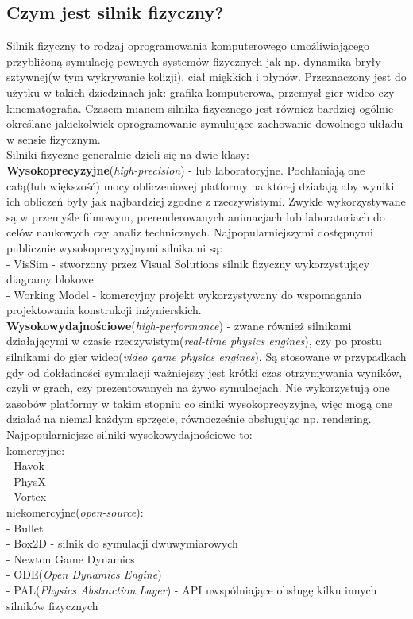   \subsection{Czym jest silnik fizyczny?}\label{subsec:czymJestSilnik}
Silnik fizyczny to rodzaj oprogramowania komputerowego umożliwiającego
przybliżoną symulację pewnych systemów fizycznych jak np. dynamika bryły
sztywnej(w tym wykrywanie kolizji), ciał miękkich i płynów. Przeznaczony jest do
użytku w takich dziedzinach jak: grafika komputerowa, przemysł gier wideo czy
kinematografia. Czasem mianem silnika fizycznego jest również bardziej ogólnie
określane jakiekolwiek oprogramowanie symulujące zachowanie dowolnego
układu w sensie fizycznym.\\
Silniki fizyczne generalnie dzieli się na dwie klasy:\\
\textbf{Wysokoprecyzyjne}(\emph{high-precision}) - lub laboratoryjne.
Pochłaniają one całą(lub większość) mocy obliczeniowej platformy na której
działają aby wyniki ich obliczeń były jak najbardziej zgodne z rzeczywistymi.
Zwykle wykorzystywane są w przemyśle filmowym, prerenderowanych animacjach lub
laboratoriach do celów naukowych czy analiz technicznych. Najpopularniejszymi
dostępnymi publicznie wysokoprecyzyjnymi silnikami są:\\
- VisSim - stworzony przez Visual Solutions silnik fizyczny wykorzystujący
diagramy blokowe\\
- Working Model - komercyjny projekt wykorzystywany do wspomagania projektowania
konstrukcji inżynierskich.\\
\textbf{Wysokowydajnościowe}(\emph{high-performance})
- zwane również silnikami działającymi w czasie rzeczywistym(\emph{real-time
physics engines}), czy po prostu silnikami do gier wideo(\emph{video game
physics engines}). Są stosowane w przypadkach gdy od dokładności symulacji
ważniejszy jest krótki czas otrzymywania wyników, czyli w grach, czy
prezentowanych na żywo symulacjach. Nie wykorzystują one zasobów platformy w
takim stopniu co siniki wysokoprecyzyjne, więc mogą one działać na niemal każdym
sprzęcie, równocześnie obsługując np. rendering. Najpopularniejsze silniki
wysokowydajnościowe to:\\
komercyjne:\\
- Havok\\
- PhysX\\
- Vortex\\
niekomercyjne(\emph{open-source}):\\
- Bullet\\
- Box2D - silnik do symulacji dwuwymiarowych\\
- Newton Game Dynamics\\
- ODE(\emph{Open Dynamics Engine})\\
- PAL(\emph{Physics Abstraction Layer}) - API uwspólniające obsługę kilku innych
silników fizycznych\\

